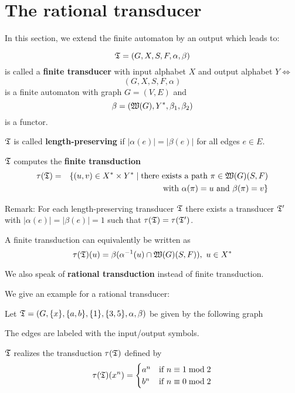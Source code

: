 \section{The rational transducer}

In this section, we extend the finite automaton by an output which leads to:

\begin{definition}
\[ \mbox{$\mathfrak{T}$} = (G, X, S, F, \alpha, \beta) \]
is called a {\bf finite transducer}
with input alphabet $X$ and output alphabet $Y \iff$
\[ (G, X, S, F, \alpha) \]
is a finite automaton with graph $G = (V, E)$ and
\[ \beta = (\mbox{$\mathfrak{W}({G})$}, Y^*, \beta_1, \beta_2) \]
is a functor.
\end{definition}

$\mbox{$\mathfrak{T}$}$ is called {\bf length-preserving} if $|\alpha(e)| = |\beta(e)|$ for all
edges $e \in E$.

$\mbox{$\mathfrak{T}$}$ computes the {\bf finite transduction}
\begin{eqnarray*}
\tau(\mbox{$\mathfrak{T}$}) & = & \{ (u, v) \in X^* \times Y^* \mid \text{there exists a path }
\pi \in \mbox{$\mathfrak{W}({G})$}(S, F) \\
& & \text{with }\alpha(\pi) = u\text{ and }\beta(\pi) = v \}
\end{eqnarray*}

Remark: For each length-preserving transducer $\mbox{$\mathfrak{T}$}$ there exists a
transducer $\mbox{$\mathfrak{T'}$}$ with $|\alpha(e)| = |\beta(e)| = 1$ such that
$\tau(\mbox{$\mathfrak{T}$}) = \tau(\mbox{$\mathfrak{T'}$})$.

A finite transduction can equivalently be written as 
\[ \tau(\mbox{$\mathfrak{T}$})(u) = \beta(\alpha^{-1}(u) \cap \mbox{$\mathfrak{W}({G})$}(S, F)),\ u \in X^* \]

We also speak of {\bf rational transduction} instead of finite transduction.

\bigskip
We give an example for a rational transducer:

Let $\mbox{$\mathfrak{T}$} = (G, \mbox{$\{x\}$}, \mbox{$\{a, b\}$}, \mbox{$\{1\}$}, \mbox{$\{3, 5\}$}, \alpha,
\beta)$ be given by the following graph

\begin{center}

\end{center}

The edges are labeled with the input/output symbols.

$\mbox{$\mathfrak{T}$}$ realizes the transduction $\tau(\mbox{$\mathfrak{T}$})$ defined by
\[ \tau(\mbox{$\mathfrak{T}$})(x^n) = \begin{cases}
a^n & \text{if } n \equiv 1 \bmod 2 \\
b^n & \text{if } n \equiv 0 \bmod 2
\end{cases} \]

